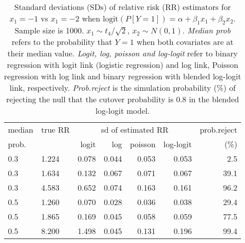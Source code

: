 \documentclass[12pt,a4paper]{article}
\begin{document}
\begin{table}[H] 
\small\sf\centering 
\caption{Standard deviations (SDs) of relative risk (RR) estimators for $x_1=-1$ vs $x_1=-2$ when $\mbox{logit}(P[Y=1])=\alpha+\beta_1 x_1 + \beta_2 x_2$. Sample size is 1000. $x_1 \sim $$t_4/\sqrt{2}$, $x_2 \sim N(0,1)$. {\it Median prob} refers to the probability that $Y=1$ when both covariates are at their median value. {\it Logit, log, poisson and log-logit} refer to binary regression with logit link (logistic regression) and log link, Poisson regression with log link and binary regression with blended log-logit link, respectively. {\it Prob.reject} is the simulation probability (\%) of rejecting the null that the cutover probability is $0.8$ in the blended log-logit model.} 
\begin{tabular}{llrrrrr} 
\toprule 
median & true RR & \multicolumn{4}{c}{sd of estimated RR} & prob.reject \\ 
prob. & & logit & log & poisson & log-logit  & (\%) \\ \midrule 
0.3 & 1.224 & 0.078 & 0.044 & 0.053 & 0.053 &  2.5 \\  
0.3 & 1.634 & 0.132 & 0.067 & 0.071 & 0.067 & 39.1 \\  
0.3 & 4.583 & 0.652 & 0.074 & 0.163 & 0.161 & 96.2 \\  
0.5 & 1.260 & 0.070 & 0.028 & 0.036 & 0.038 & 29.4 \\  
0.5 & 1.865 & 0.169 & 0.045 & 0.058 & 0.059 & 77.5 \\  
0.5 & 8.200 & 1.498 & 0.045 & 0.131 & 0.196 & 99.4 \\  
\bottomrule 
\end{tabular} 
\end{table} 
\end{document}
